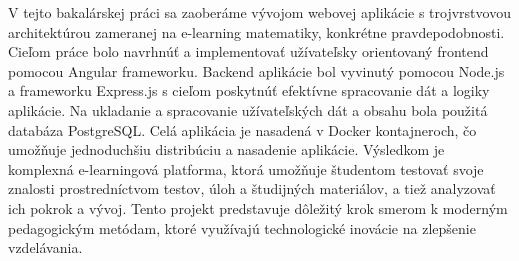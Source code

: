 V tejto bakalárskej práci sa zaoberáme vývojom webovej aplikácie s trojvrstvovou architektúrou zameranej na e-learning matematiky, konkrétne pravdepodobnosti. 
Cieľom práce bolo navrhnúť a implementovať užívateľsky orientovaný frontend pomocou Angular frameworku. 
Backend aplikácie bol vyvinutý pomocou Node.js a frameworku Express.js s cieľom poskytnúť efektívne spracovanie dát a logiky aplikácie. 
Na ukladanie a spracovanie užívateľských dát a obsahu bola použitá databáza PostgreSQL. 
Celá aplikácia je nasadená v Docker kontajneroch, čo umožňuje jednoduchšiu distribúciu a nasadenie aplikácie. 
Výsledkom je komplexná e-learningová platforma, ktorá umožňuje študentom testovať svoje znalosti prostredníctvom testov, úloh a študijných materiálov, a tiež analyzovať ich pokrok a vývoj. 
Tento projekt predstavuje dôležitý krok smerom k moderným pedagogickým metódam, ktoré využívajú technologické inovácie na zlepšenie vzdelávania.